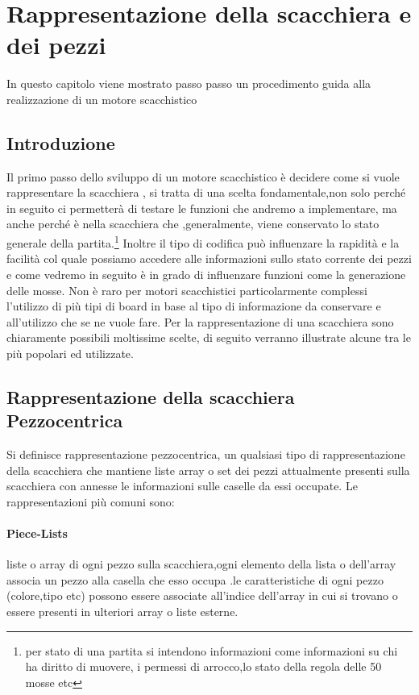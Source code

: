 \chapter{Rappresentazione della scacchiera e dei pezzi} %
%

\begin{citazione}
    In questo capitolo viene mostrato passo passo un procedimento guida alla realizzazione di un motore scacchistico
\end{citazione}

\newpage

\section{Introduzione} %
Il primo passo dello sviluppo di un motore scacchistico è decidere come si vuole rappresentare
la scacchiera , si tratta di una scelta fondamentale,non solo perché in seguito ci permetterà
di testare le funzioni che andremo a implementare, ma anche perché è nella scacchiera che ,generalmente,
viene conservato lo stato generale della partita.\footnote{per stato di una partita si intendono informazioni come
    informazioni su chi ha diritto di muovere, i permessi di arrocco,lo stato della regola delle 50 mosse etc}
Inoltre il tipo di codifica può influenzare la rapidità
e la facilità col quale possiamo accedere alle informazioni sullo stato corrente dei pezzi
e come vedremo in seguito è in grado di influenzare funzioni come la generazione delle mosse.
Non è raro per motori scacchistici particolarmente complessi l'utilizzo di più tipi di board in base
al tipo di informazione da conservare e all'utilizzo che se ne vuole fare.
Per la rappresentazione di una scacchiera sono chiaramente possibili moltissime scelte, di seguito
verranno illustrate alcune tra le più popolari ed utilizzate.

\section{Rappresentazione della scacchiera Pezzocentrica}
Si definisce rappresentazione pezzocentrica, un qualsiasi tipo di rappresentazione della scacchiera che mantiene liste
array o set dei pezzi attualmente presenti sulla scacchiera con annesse le informazioni sulle caselle da essi occupate.
Le rappresentazioni più comuni sono:
\subsubsection{Piece-Lists}
liste o array di ogni pezzo sulla scacchiera,ogni elemento della lista o dell'array associa un pezzo
alla casella che esso occupa .le caratteristiche di ogni pezzo (colore,tipo etc)
possono essere associate all'indice dell'array in cui si trovano o essere presenti in ulteriori array
o liste esterne.


